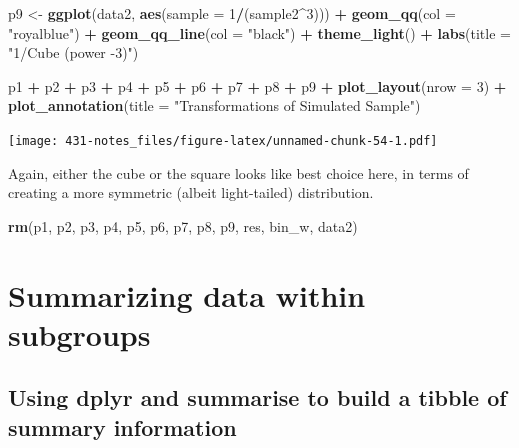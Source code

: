 \documentclass[
]{book}
\newenvironment{Shaded}{\begin{snugshade}}{\end{snugshade}}
\newcommand{\DataTypeTok}[1]{\textcolor[rgb]{0.13,0.29,0.53}{#1}}
\newcommand{\DecValTok}[1]{\textcolor[rgb]{0.00,0.00,0.81}{#1}}
\newcommand{\KeywordTok}[1]{\textcolor[rgb]{0.13,0.29,0.53}{\textbf{#1}}}
\newcommand{\NormalTok}[1]{#1}
\newcommand{\OperatorTok}[1]{\textcolor[rgb]{0.81,0.36,0.00}{\textbf{#1}}}
\newcommand{\StringTok}[1]{\textcolor[rgb]{0.31,0.60,0.02}{#1}}
\begin{document}
\begin{Shaded}
\begin{Highlighting}[]
\NormalTok{p9 <-}\StringTok{ }\KeywordTok{ggplot}\NormalTok{(data2, }\KeywordTok{aes}\NormalTok{(}\DataTypeTok{sample =} \DecValTok{1}\OperatorTok{/}\NormalTok{(sample2}\OperatorTok{^}\DecValTok{3}\NormalTok{))) }\OperatorTok{+}
\StringTok{    }\KeywordTok{geom_qq}\NormalTok{(}\DataTypeTok{col =} \StringTok{"royalblue"}\NormalTok{) }\OperatorTok{+}\StringTok{ }
\StringTok{    }\KeywordTok{geom_qq_line}\NormalTok{(}\DataTypeTok{col =} \StringTok{"black"}\NormalTok{) }\OperatorTok{+}
\StringTok{    }\KeywordTok{theme_light}\NormalTok{() }\OperatorTok{+}
\StringTok{    }\KeywordTok{labs}\NormalTok{(}\DataTypeTok{title =} \StringTok{"1/Cube (power -3)"}\NormalTok{)}


\NormalTok{p1 }\OperatorTok{+}\StringTok{ }\NormalTok{p2 }\OperatorTok{+}\StringTok{ }\NormalTok{p3 }\OperatorTok{+}\StringTok{ }\NormalTok{p4 }\OperatorTok{+}\StringTok{ }\NormalTok{p5 }\OperatorTok{+}\StringTok{ }\NormalTok{p6 }\OperatorTok{+}\StringTok{ }\NormalTok{p7 }\OperatorTok{+}\StringTok{ }\NormalTok{p8 }\OperatorTok{+}\StringTok{ }\NormalTok{p9 }\OperatorTok{+}
\StringTok{    }\KeywordTok{plot_layout}\NormalTok{(}\DataTypeTok{nrow =} \DecValTok{3}\NormalTok{) }\OperatorTok{+}
\StringTok{    }\KeywordTok{plot_annotation}\NormalTok{(}\DataTypeTok{title =} \StringTok{"Transformations of Simulated Sample"}\NormalTok{)}
\end{Highlighting}
\end{Shaded}

\texttt{[image: 431-notes\_files/figure-latex/unnamed-chunk-54-1.pdf]}

Again, either the cube or the square looks like best choice here, in terms of creating a more symmetric (albeit light-tailed) distribution.

\begin{Shaded}
\begin{Highlighting}[]
\KeywordTok{rm}\NormalTok{(p1, p2, p3, p4, p5, p6, p7, p8, p9, res, bin_w, data2)}
\end{Highlighting}
\end{Shaded}

\hypertarget{summarizing-data-within-subgroups}{%
\chapter{Summarizing data within subgroups}\label{summarizing-data-within-subgroups}}

\hypertarget{using-dplyr-and-summarise-to-build-a-tibble-of-summary-information}{%
\section{Using dplyr and summarise to build a tibble of summary information}\label{using-dplyr-and-summarise-to-build-a-tibble-of-summary-information}}
\end{document}
